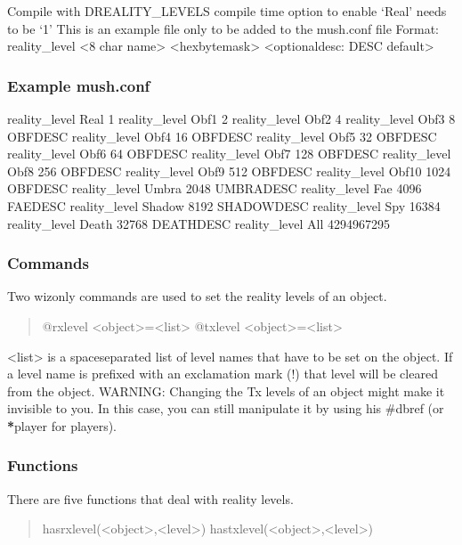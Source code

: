 \documentclass[letterpaper,10pt,english]{sphinxmanual}
\begin{document}
\sphinxAtStartPar
Compile with \sphinxhyphen{}DREALITY\_LEVELS compile time option to enable ‘Real’ needs to be ‘1’
This is an example file only to be added to the mush.conf file
Format: reality\_level \textless{}8 char name\textgreater{} \textless{}hex\sphinxhyphen{}byte\sphinxhyphen{}mask\textgreater{} \textless{}optional\sphinxhyphen{}desc: DESC default\textgreater{}


\subsubsection{Example mush.conf}
\label{\detokenize{advanced:example-mush-conf}}
\sphinxAtStartPar
reality\_level Real 1
reality\_level Obf1 2
reality\_level Obf2 4
reality\_level Obf3 8 OBFDESC
reality\_level Obf4 16 OBFDESC
reality\_level Obf5 32 OBFDESC
reality\_level Obf6 64 OBFDESC
reality\_level Obf7 128 OBFDESC
reality\_level Obf8 256 OBFDESC
reality\_level Obf9 512 OBFDESC
reality\_level Obf10 1024 OBFDESC
reality\_level Umbra 2048 UMBRADESC
reality\_level Fae 4096 FAEDESC
reality\_level Shadow 8192 SHADOWDESC
reality\_level Spy 16384
reality\_level Death 32768 DEATHDESC
reality\_level All 4294967295


\subsubsection{Commands}
\label{\detokenize{advanced:commands}}
\sphinxAtStartPar
Two wiz\sphinxhyphen{}only commands are used to set the reality levels of an object.
\begin{quote}

\sphinxAtStartPar
@rxlevel \textless{}object\textgreater{}=\textless{}list\textgreater{}
@txlevel \textless{}object\textgreater{}=\textless{}list\textgreater{}
\end{quote}

\sphinxAtStartPar
\textless{}list\textgreater{} is a space\sphinxhyphen{}separated list of level names that have to be set on the
object. If a level name is prefixed with an exclamation mark (!) that level
will be cleared from the object.
WARNING: Changing the Tx levels of an object might make it invisible to you.
In this case, you can still manipulate it by using his \#dbref (or {\color{red}\bfseries{}*}player
for players).


\subsubsection{Functions}
\label{\detokenize{advanced:functions}}
\sphinxAtStartPar
There are five functions that deal with reality levels.
\begin{quote}

\sphinxAtStartPar
hasrxlevel(\textless{}object\textgreater{},\textless{}level\textgreater{})
hastxlevel(\textless{}object\textgreater{},\textless{}level\textgreater{})
\end{quote}
\end{document}

